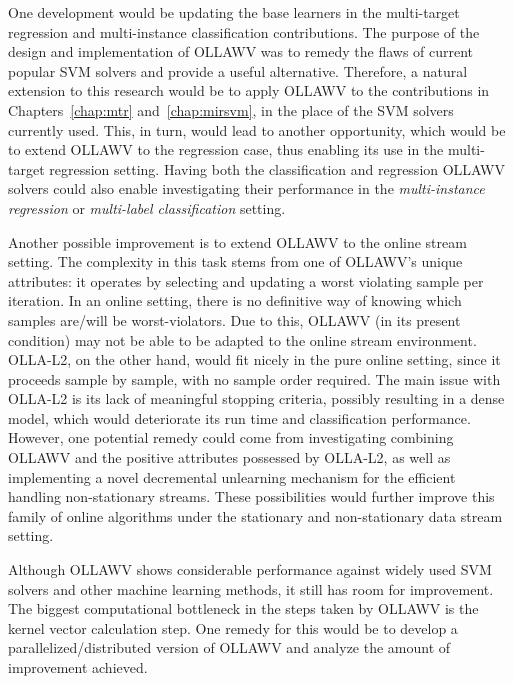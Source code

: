 \documentclass[reqno]{vcuthesis}
\numberwithin{equation}{chapter}
\begin{document}
One development would be updating the base learners in the multi-target regression and multi-instance classification contributions. The purpose of the design and implementation of OLLAWV was to remedy the flaws of current popular SVM solvers and provide a useful alternative. Therefore, a natural extension to this research would be to apply OLLAWV to the contributions in Chapters~\ref{chap:mtr} and~\ref{chap:mirsvm}, in the place of the SVM solvers currently used. This, in turn, would lead to another opportunity, which would be to extend OLLAWV to the regression case, thus enabling its use in the multi-target regression setting. Having both the classification and regression OLLAWV solvers could also enable investigating their performance in the \textit{multi-instance regression} or \textit{multi-label classification} setting.

Another possible improvement is to extend OLLAWV to the online stream setting. The complexity in this task stems from one of OLLAWV's unique attributes: it operates by selecting and updating a worst violating sample per iteration. In an online setting, there is no definitive way of knowing which samples are/will be worst-violators. Due to this, OLLAWV (in its present condition) may not be able to be adapted to the online stream environment. OLLA-L2, on the other hand, would fit nicely in the pure online setting, since it proceeds sample by sample, with no sample order required. The main issue with OLLA-L2 is its lack of meaningful stopping criteria, possibly resulting in a dense model, which would deteriorate its run time and classification performance. However, one potential remedy could come from investigating combining OLLAWV and the positive attributes possessed by OLLA-L2, as well as implementing a novel decremental unlearning mechanism for the efficient handling non-stationary streams. These possibilities would further improve this family of online algorithms under the stationary and non-stationary data stream setting.

Although OLLAWV shows considerable performance against widely used SVM solvers and other machine learning methods, it still has room for improvement. The biggest computational bottleneck in the steps taken by OLLAWV is the kernel vector calculation step. One remedy for this would be to develop a parallelized/distributed version of OLLAWV and analyze the amount of improvement achieved. 

\printbibliography[title={References}, heading=bibintoc]
\end{document}
